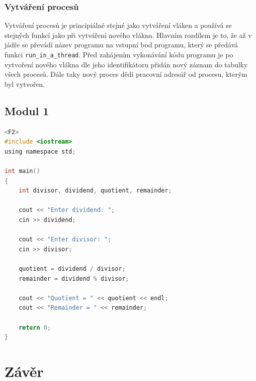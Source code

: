 \documentclass[12pt, a4paper]{article}
\let\oldsection\section
\renewcommand\section{\clearpage\oldsection}
\begin{document}
\subsubsection{Vytváření procesů}
Vytváření procesů je principiálně stejné jako vytváření vláken a používá se stejných funkcí jako při vytváření nového vlákna. Hlavním rozdílem je to, že až v jádře se převádí název programu na vstupní bod programu, který se předává funkci \texttt{run\_in\_a\_thread}. Před zahájením vykonávání kódu programu je po vytvoření nového vlákna dle jeho identifikátoru přidán nový záznam do tabulky všech procesů. Dále taky nový proces dědí pracovní adresář od procesu, kterým byl vytvořen.


    \subsection{Modul 1}
    	    \begin{lstlisting}[language=C, caption={Lorem ipsum dolor sit amet},captionpos=b]<F2>
#include <iostream>
using namespace std;

int main()
{    
    int divisor, dividend, quotient, remainder;

    cout << "Enter dividend: ";
    cin >> dividend;

    cout << "Enter divisor: ";
    cin >> divisor;

    quotient = dividend / divisor;
    remainder = dividend % divisor;

    cout << "Quotient = " << quotient << endl;
    cout << "Remainder = " << remainder;

    return 0;
}\end{lstlisting}


\section{Závěr}	
\end{document}
